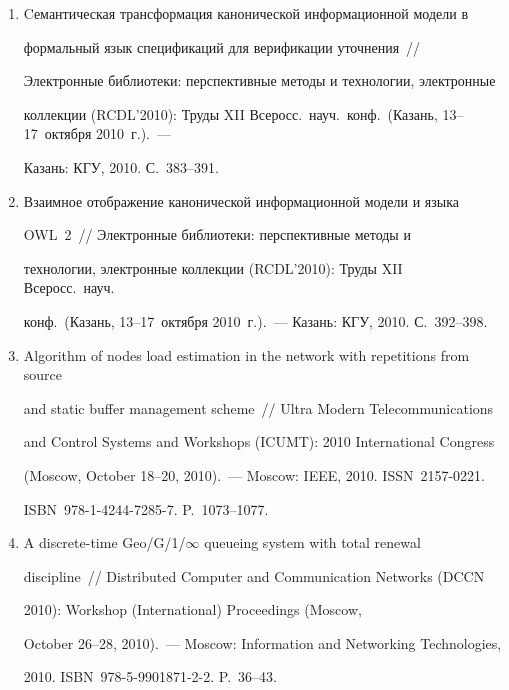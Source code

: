 \begin{enumerate}[1.]
общ.\ ред.\ А.\,Л.~Стемпковского.~--- М.: ИППМ РАН, 2010. C.~418--423.


\item {}


Cемантическая трансформация канонической информационной модели в 


формальный язык спецификаций для верификации уточнения~/\!\!/  


Электронные библиотеки: перспективные методы и технологии, электронные 


коллекции (RCDL'2010): Труды XII Всеросс.\ науч.\ конф.\ (Казань, 13--17~октября 2010~г.).~--- 


Казань: КГУ, 2010. С.~383--391.


\item {}


Взаимное отображение канонической информационной модели и языка 


OWL~2~/\!\!/  Электронные библиотеки: перспективные методы и 


технологии, электронные коллекции (RCDL'2010): Труды XII Всеросс.\ науч.\ 


конф.\ (Казань, 13--17~октября 2010~г.).~--- Казань: КГУ, 2010. С.~392--398.


\item {}


Algorithm of nodes load estimation in the network with repetitions from source 


and static buffer management scheme~/\!\!/  Ultra Modern Telecommunications 


and Control Systems and Workshops (ICUMT): 2010 International Congress 


(Moscow, October 18--20, 2010).~--- Moscow: IEEE, 2010. ISSN~2157-0221. 


ISBN~978-1-4244-7285-7. P.~1073--1077.


\item {}


A discrete-time Geo/G/1/$\infty$ queueing system with total renewal 


discipline~/\!\!/  Distributed Computer and Communication Networks (DCCN 


2010):  Workshop (International) Proceedings (Moscow, 


October 26--28, 2010).~---  Moscow: Information and Networking Technologies, 


2010. ISBN~978-5-9901871-2-2. P.~36--43.



\end{enumerate}
